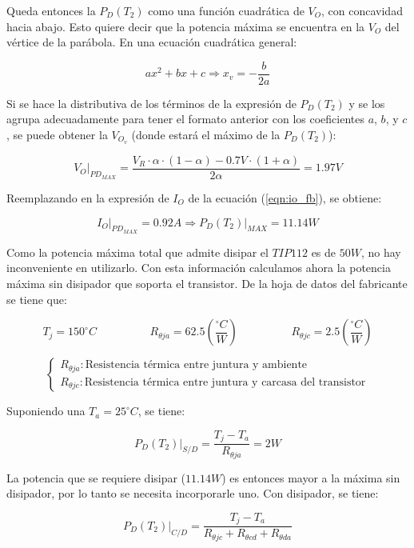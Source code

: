 Queda entonces la $P_D(T_2)$ como una funci\'on cuadr\'atica de $V_O$, con concavidad hacia abajo. Esto quiere decir que la potencia m\'axima se encuentra en la $V_O$ del v\'ertice de la par\'abola. En una ecuaci\'on cuadr\'atica general:

\[
ax^2 + bx + c \Longrightarrow x_v = -\frac{b}{2a} 
\]

Si se hace la distributiva de los t\'erminos de la expresi\'on de $P_D(T_2)$ y se los agrupa adecuadamente para tener el formato anterior con los coeficientes $a$, $b$, y $c$, se puede obtener la $V_{O_v}$ (donde estar\'a el m\'aximo de la $P_D(T_2)$):

\[
V_O \biggr|_{PD_{MAX}} = \frac{V_R \cdot \alpha \cdot (1-\alpha) - 0.7V \cdot (1+\alpha)}{2\alpha} = 1.97V
\]

Reemplazando en la expresi\'on de $I_O$ de la ecuaci\'on (\ref{eqn:io_fb}), se obtiene:

\[
I_O \biggr|_{PD_{MAX}} = 0.92A \Longrightarrow P_D(T_2) \biggr|_{MAX} = 11.14W
\]
 
Como la potencia m\'axima total que admite disipar el $TIP112$ es de $50W$, no hay inconveniente en utilizarlo. Con esta informaci\'on calculamos ahora la potencia m\'axima sin disipador que soporta el transistor. De la hoja de datos del fabricante se tiene que:

\[
T_j = 150^{\circ}C  \hspace{2cm} R_{\theta ja} = 62.5 \left( \frac{^{\circ}C}{W}\right) \hspace{2cm} R_{\theta jc} = 2.5 \left(\frac{^{\circ}C}{W}\right)
\] 
 
\[
\left\lbrace
\begin{array}{l}
R_{\theta ja}: \textrm{Resistencia t\'ermica entre juntura y ambiente} \\
R_{\theta jc}: \textrm{Resistencia t\'ermica entre juntura y carcasa del transistor}
\end{array}
\right.
\] 
 
\newpage 
 
Suponiendo una $T_a = 25^{\circ}C$, se tiene:

\[
P_D(T_2) \biggr|_{S/D} = \frac{T_j - T_a}{R_{\theta ja}} = 2W
\]
 
La potencia que se requiere disipar ($11.14W$) es entonces mayor a la m\'axima sin disipador, por lo tanto se necesita incorporarle uno. Con disipador, se tiene:

\[
P_D(T_2) \biggr|_{C/D} = \frac{T_j - T_a}{R_{\theta jc} + R_{\theta cd} + R_{\theta da}}
\]
 
